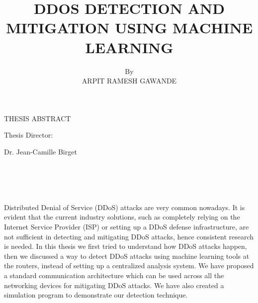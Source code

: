 \documentclass[12pt,oneside,a4paper]{article}
\title{DDOS DETECTION AND MITIGATION USING MACHINE LEARNING}
\author{By \\ ARPIT RAMESH GAWANDE}
\date{}
\begin{document}
\renewcommand{\thepage}{\roman{page}}%
\setcounter{page}{2}%
\makeatletter
{\centering THESIS ABSTRACT \par
\vspace{3mm}
\large\@title \par
\vspace{3mm}
\@author \par
\vspace{3mm}
Thesis Director: \par
Dr. Jean-Camille Birget \par}
\\~\\~\\~\\ %
Distributed Denial of Service (DDoS) attacks are very common nowadays. It is evident that the current industry solutions, such as completely relying on the Internet Service Provider (ISP) or setting up a DDoS defense infrastructure, are not sufficient in detecting and mitigating DDoS attacks, hence consistent research is needed. In this thesis we first tried to understand how DDoS attacks happen, then we discussed a way to detect DDoS attacks using machine learning tools at the routers, instead of setting up a centralized analysis system. We have proposed a standard communication architecture which can be used across all the networking devices for mitigating DDoS attacks. We have also created a simulation program to demonstrate our detection technique.
\end{document}
